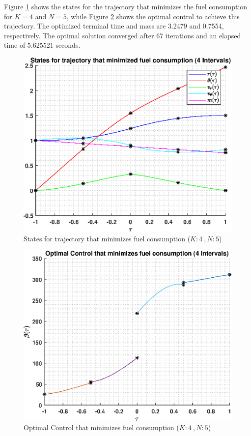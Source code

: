 \documentclass[]{article}
\begin{document}
\vspace{2mm}\newline 
Figure \ref{fig:directStatesK4Poly5} shows the states for the trajectory that minimizes the fuel consumption for \(K = 4\) and  \(N = 5\), while Figure \ref{fig:directControlK4Poly5} shows the optimal control to achieve this trajectory. The optimized terminal time and mass are 3.2479 and 0.7554, respectively. The optimal solution converged after 67 iterations and an elapsed time of 5.625521 seconds.
\begin{figure}
	\centering
	\includegraphics[scale=0.75]{directStatesK4Poly5.eps}
	\caption{States for trajectory that minimizes fuel consumption (\(K:4\ , N:5\))}
	\label{fig:directStatesK4Poly5}
\end{figure}
\begin{figure}
	\centering
	\includegraphics[scale=0.75]{directControlK4Poly5.eps}
	\caption{Optimal Control that minimizes fuel consumption (\(K:4\ , N:5\))}
	\label{fig:directControlK4Poly5}
\end{figure}
\end{document}

